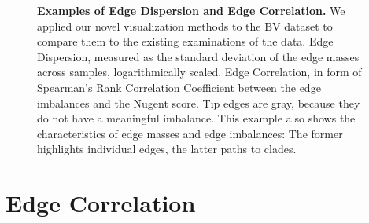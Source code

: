 \begin{figure}[!ht]
    \centering
    \begin{subfigure}{0pt}
        \label{fig:var_cor:sub:em_varl}
    \end{subfigure}
    \begin{subfigure}{0pt}
        \label{fig:var_cor:sub:ei_var}
    \end{subfigure}
    \caption[Examples of Edge Dispersion and Edge Correlation]{
        \textbf{Examples of Edge Dispersion and Edge Correlation.}
        We applied our novel visualization methods to the \ac{BV} dataset
        to compare them to the existing examinations of the data.
        Edge Dispersion, measured as the standard deviation of the edge masses across samples, logarithmically scaled.
        Edge Correlation, in form of Spearman's Rank Correlation Coefficient
        between the edge imbalances and the Nugent score.
        Tip edges are gray, because they do not have a meaningful imbalance.
        This example also shows the characteristics of edge masses and edge imbalances:
        The former highlights individual edges, the latter paths to clades.
    }
    \label{fig:var_cor}
\end{figure}


\section{Edge Correlation}
\label{ch:Visualization:sec:EdgeCorrelation}

